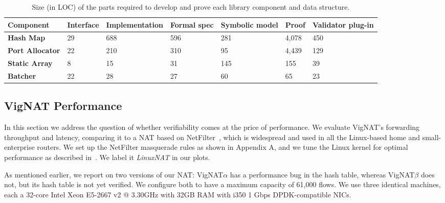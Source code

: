 \documentclass[letterpaper,twocolumn,10pt]{article}
\newcommand{\vignat}{{\sc VigNAT}\xspace}
\newcommand{\vignata}{{\sc VigNAT$\alpha$}\xspace}
\newcommand{\vignatb}{{\sc VigNAT$\beta$}\xspace}
\begin{document}
\begin{table}[h!]
\centering
\caption{Size (in LOC) of the parts required to develop and prove each  library component and data structure.}
\label{tab:loc}
\begin{tabular}{lllllll}
\hline
  Component             & Interface & Implementation & Formal spec & Symbolic model & Proof & Validator plug-in \\ \hline
{\bf Hash Map}        & 29         & 688            & 596                  & 281            & 4,078         & 450              \\
{\bf Port Allocator} & 22         & 210            & 310                  & 95             & 4,439         & 129              \\
{\bf Static Array}   & 8          & 15             & 31                   & 145            & 155          & 39               \\
{\bf Batcher}        & 22         & 28             & 27                   & 60             & 65           & 23               \\ \hline
\end{tabular}
\end{table}

\subsection{\vignat Performance}
\label{sec:performance}

In this section we address the question of whether verifiability comes at the price of performance. We evaluate \vignat's forwarding throughput and latency, comparing it to a NAT based on  NetFilter~\cite{boye2013netfilter}, which is widespread and used in all the Linux-based home and small-enterprise routers. We set up the NetFilter masquerade rules as shown in Appendix A, and we tune the Linux kernel for optimal performance as described in~\cite{nf-testing}. We label it {\em LinuxNAT} in our plots.

As mentioned earlier, we report on two versions of our NAT: \vignata has a performance bug in the hash table, whereas \vignatb does not, but its hash table is not yet verified. We configure both to have a maximum capacity of 61,000 flows. We use three identical machines, each a 32-core Intel Xeon E5-2667 v2 @ 3.30GHz with 32GB RAM with i350 1 Gbps DPDK-compatible NICs. 

\end{document}
